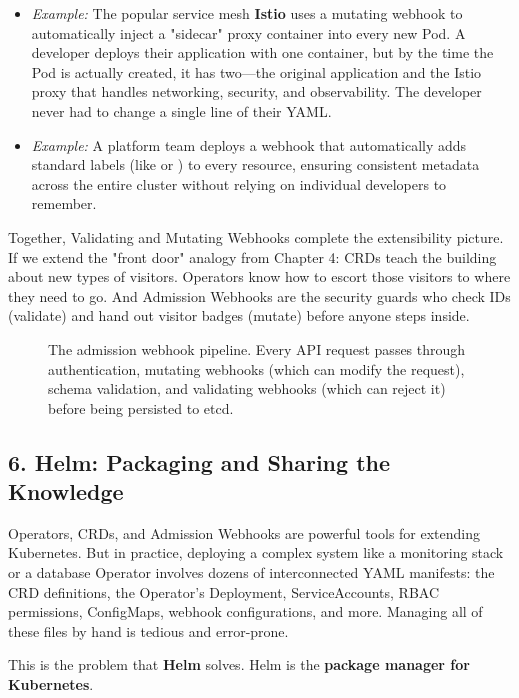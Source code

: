 \begin{itemize}
\item \textit{Example:} The popular service mesh \textbf{Istio} uses a mutating webhook to automatically inject a "sidecar" proxy container into every new Pod. A developer deploys their application with one container, but by the time the Pod is actually created, it has two---the original application and the Istio proxy that handles networking, security, and observability. The developer never had to change a single line of their YAML.
\item \textit{Example:} A platform team deploys a webhook that automatically adds standard labels (like  or ) to every resource, ensuring consistent metadata across the entire cluster without relying on individual developers to remember.
\end{itemize}

Together, Validating and Mutating Webhooks complete the extensibility picture. If we extend the "front door" analogy from Chapter 4: CRDs teach the building about new types of visitors. Operators know how to escort those visitors to where they need to go. And Admission Webhooks are the security guards who check IDs (validate) and hand out visitor badges (mutate) before anyone steps inside.

\begin{figure}[htbp]
\centering

\caption{The admission webhook pipeline. Every API request passes through authentication, mutating webhooks (which can modify the request), schema validation, and validating webhooks (which can reject it) before being persisted to etcd.}
\label{fig:6_3}
\end{figure}



\subsection{6. Helm: Packaging and Sharing the Knowledge}


Operators, CRDs, and Admission Webhooks are powerful tools for extending Kubernetes. But in practice, deploying a complex system like a monitoring stack or a database Operator involves dozens of interconnected YAML manifests: the CRD definitions, the Operator's Deployment, ServiceAccounts, RBAC permissions, ConfigMaps, webhook configurations, and more. Managing all of these files by hand is tedious and error-prone.

This is the problem that \textbf{Helm} solves. Helm is the \textbf{package manager for Kubernetes}.

